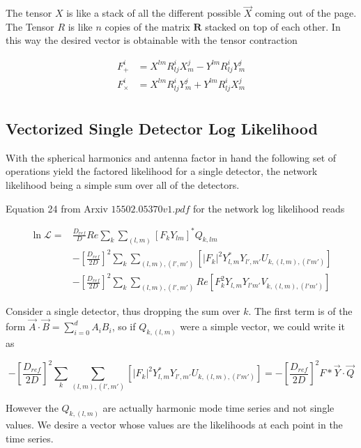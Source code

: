 The tensor $X$ is like a stack of all the different possible $\vec{X}$ coming out of the page. The Tensor $R$ is like $n$ copies of the matrix $\mathbf{R}$ stacked on top of each other. In this way the desired vector is obtainable with the tensor contraction

\begin{align}
F^{i}_{+} &= X^{lm}R^{i}_{lj}X^{j}_{m} - Y^{lm}R^{i}_{lj}Y^{j}_{m} \\ 
F^{i}_{\times} &= X^{lm}R^{i}_{lj}Y^{j}_{m} + Y^{lm}R^{i}_{lj}X^{j}_{m} \\ 
\end{align}

\subsection{Vectorized Single Detector Log Likelihood}

With the spherical harmonics and antenna factor in hand the following set of operations yield the factored likelihood for a single detector, the network likelihood being a simple sum over all of the detectors.

Equation 24 from Arxiv $15502.05370v1.pdf$ for the network log likelihood reads 

\begin{align}
\ln{\mathcal{L}} = &\frac{D_{ref}}{D}Re \sum_{k}\sum_{(l,m)}\left[F_k Y_{lm}\right]^{*}Q_{k,lm} \\ 
& - \left[\frac{D_{ref}}{2D}\right]^{2}\sum_{k}\sum_{(l,m),(l',m')}\left[|F_k|^2 Y_{l,m}^{*}Y_{l',m'}U_{k,(l,m),(l'm')}\right] \\
 & - \left[\frac{D_{ref}}{2D}\right]^{2}\sum_{k}\sum_{(l,m),(l',m')}Re\left[  F_{k}^{2}Y_{l,m}Y_{l'm'}V_{k,(l,m),(l'm')}\right]
\end{align}

Consider a single detector, thus dropping the sum over $k$. The first term is of the form $\vec{A}\cdot\vec{B} = \sum_{i=0}^{d}A_iB_i$, so if $Q_{k,(l,m)}$ were a simple vector, we could write it as

\begin{equation}
- \left[\frac{D_{ref}}{2D}\right]^{2}\sum_{k}\sum_{(l,m),(l',m')}\left[|F_k|^2 Y_{l,m}^{*}Y_{l',m'}U_{k,(l,m),(l'm')}\right] = - \left[\frac{D_{ref}}{2D}\right]^{2} F*\vec{Y}\cdot\vec{Q}
\end{equation}

However the $Q_{k,(l,m)}$ are actually harmonic mode time series and not single values. We desire a vector whose values are the likelihoods at each point in the time series. 

